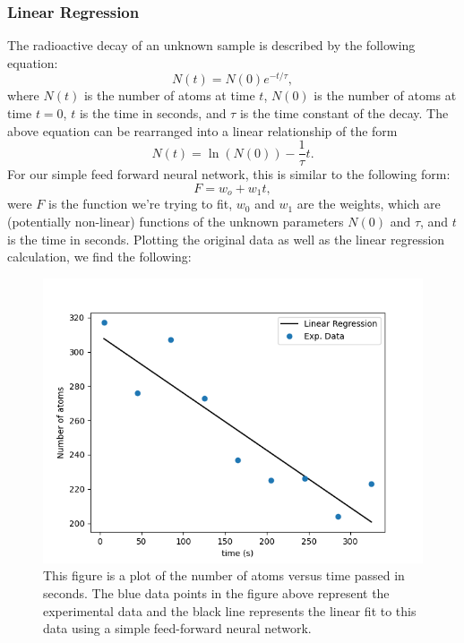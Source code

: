 \subsubsection{Linear Regression}
The radioactive decay of an unknown sample is described by the following equation:
\begin{equation}
N(t) = N(0) e^{-t/\tau},
\end{equation}
where $N(t)$ is the number of atoms at time $t$, $N(0)$ is the number of atoms at time $t=0$, $t$ is the time in seconds, and $\tau$ is the time constant of the decay. The above equation can be rearranged into a linear relationship of the form 
\begin{equation}
N(t) = \ln{\left( N(0) \right)} - \frac{1}{\tau}t.
\end{equation}
For our simple feed forward neural network, this is similar to the following form:
\begin{equation}
F = w_o + w_1t,
\end{equation}
were $F$ is the function we're trying to fit, $w_0$ and $w_1$ are the weights, which are (potentially non-linear) functions of the unknown parameters $N(0)$ and $\tau$, and $t$ is the time in seconds. Plotting the original data as well as the linear regression calculation, we find the following:
\begin{figure}[H]
\centering
\includegraphics[scale=0.75]{../figures/decay_data.png}
\caption{This figure is a plot of the number of atoms versus time passed in seconds. The blue data points in the figure above represent the experimental data and the black line represents the linear fit to this data using a simple feed-forward neural network.}
\end{figure}